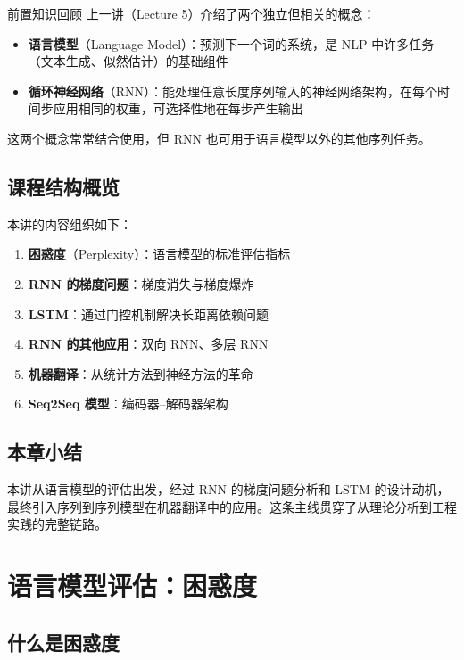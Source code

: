 \documentclass[a4paper]{article}
\begin{document}
\begin{knowledgebox}{前置知识回顾}
上一讲（Lecture 5）介绍了两个独立但相关的概念：
\begin{itemize}
    \item \textbf{语言模型}（Language Model）：预测下一个词的系统，是 NLP 中许多任务（文本生成、似然估计）的基础组件
    \item \textbf{循环神经网络}（RNN）：能处理任意长度序列输入的神经网络架构，在每个时间步应用相同的权重，可选择性地在每步产生输出
\end{itemize}
这两个概念常常结合使用，但 RNN 也可用于语言模型以外的其他序列任务。
\end{knowledgebox}

\subsection{课程结构概览}

本讲的内容组织如下：

\begin{enumerate}
    \item \textbf{困惑度}（Perplexity）：语言模型的标准评估指标
    \item \textbf{RNN 的梯度问题}：梯度消失与梯度爆炸
    \item \textbf{LSTM}：通过门控机制解决长距离依赖问题
    \item \textbf{RNN 的其他应用}：双向 RNN、多层 RNN
    \item \textbf{机器翻译}：从统计方法到神经方法的革命
    \item \textbf{Seq2Seq 模型}：编码器--解码器架构
\end{enumerate}

\subsection{本章小结}

本讲从语言模型的评估出发，经过 RNN 的梯度问题分析和 LSTM 的设计动机，最终引入序列到序列模型在机器翻译中的应用。这条主线贯穿了从理论分析到工程实践的完整链路。


\section{语言模型评估：困惑度}

\subsection{什么是困惑度}
\end{document}
